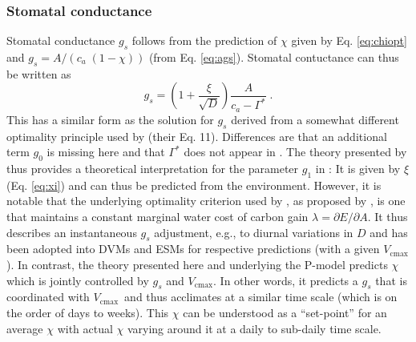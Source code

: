 \documentclass{myreport}
\newcommand{\vcmax}{$V_{\text{cmax}}$}
\begin{document}
\subsubsection{Stomatal conductance}
Stomatal conductance $g_s$ follows from the prediction of $\chi$ given by Eq. \ref{eq:chiopt} and $g_s = A / ( c_a\;(1-\chi) )$ (from Eq. \ref{eq:ags}). Stomatal contuctance can thus be written as
\begin{equation}
    g_s = \left( 1 + \frac{\xi}{\sqrt{D}} \right) \frac{A}{c_a - \Gamma^\ast}\;.
\end{equation}
This has a similar form as the solution for $g_s$ derived from a somewhat different optimality principle used by \cite{medlyn11gcb} (their Eq. 11). Differences are that an additional term $g_0$ is missing here and that $\Gamma^\ast$ does not appear in \cite{medlyn11gcb}. The theory presented by \cite{prentice14ecollett} thus provides a theoretical interpretation for the parameter $g_1$ in \cite{medlyn11gcb}: It is given by $\xi$ (Eq. \ref{eq:xi}) and can thus be predicted from the environment. However, it is notable that the underlying optimality criterion used by \cite{medlyn11gcb}, as proposed by \cite{Cowan1977-ud}, is one that maintains a constant marginal water cost of carbon gain $\lambda = \partial E / \partial A$. It thus describes an instantaneous $g_s$ adjustment, e.g., to diurnal variations in $D$ and has been adopted into DVMs and ESMs for respective predictions (with a given \vcmax ). In contrast, the theory presented here and underlying the P-model predicts $\chi$ which is jointly controlled by $g_s$ and \vcmax . In other words, it predicts a $g_s$ that is coordinated with \vcmax\ and thus acclimates at a similar time scale (which is on the order of days to weeks). This $\chi$ can be understood as a ``set-point'' for an average $\chi$ with actual $\chi$ varying around it at a daily to sub-daily time scale.

\end{document}
